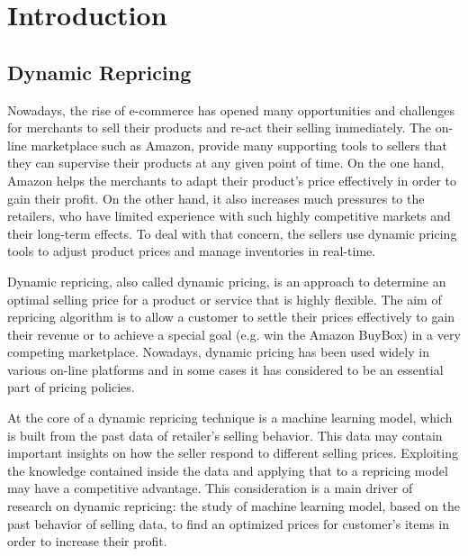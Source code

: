 \chapter{Introduction}
\label{sec:introduction}

\section{Dynamic Repricing}
\label{sec:dynamicrepricing}
Nowadays, the rise of e-commerce has opened many opportunities and challenges 
for merchants to sell their products and re-act their selling immediately. 
The on-line marketplace such as Amazon, provide many supporting tools to sellers 
that they can supervise their products at any given point of time. 
On the one hand, Amazon helps the merchants to adapt their product's 
price effectively in order to gain their profit. On the other hand, it also increases 
much pressures to the retailers, who have limited experience with such highly
competitive markets and their long-term effects. To deal with that concern, the sellers 
use dynamic pricing tools to adjust product prices and manage inventories in real-time. 

Dynamic repricing, also called dynamic pricing, is an approach to determine an optimal selling price 
for a product or service that is highly flexible. The aim of repricing algorithm is to allow a customer 
to settle their prices effectively to gain their revenue or to achieve a special goal (e.g. win the Amazon BuyBox) in a very competing marketplace. 
Nowadays, dynamic pricing has been used widely in various on-line platforms and in some cases it has considered to be an essential part of pricing policies.

At the core of a dynamic repricing technique is a machine learning model, which is built from 
the past data of retailer's selling behavior. This data may contain important insights on how the 
seller respond to different selling prices. Exploiting the knowledge contained inside the data and 
applying that to a repricing model may have a competitive advantage. This consideration 
is a main driver of research on dynamic repricing: the study of machine learning model, based on the past behavior of selling data, to find an optimized 
prices for customer's items in order to increase their profit.

